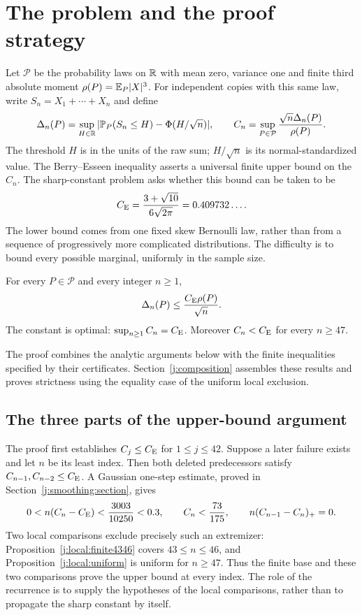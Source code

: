 \section{The problem and the proof strategy}
\label{j:introduction}

Let $\mathcal P$ be the probability laws on $\mathbb R$ with mean zero,
variance one and finite third absolute moment $\rho(P)=\mathbb E_P|X|^3$.
For independent copies with this same law, write $S_n=X_1+\cdots+X_n$
and define
\[
 \Delta_n(P)=\sup_{H\in\mathbb R}|\mathbb P_P(S_n\le H)-\Phi(H/\sqrt n)|,
 \qquad C_n=\sup_{P\in\mathcal P}\frac{\sqrt n\Delta_n(P)}{\rho(P)}.
\]
The threshold $H$ is in the units of the raw sum; $H/\sqrt n$ is its
normal-standardized value. The Berry--Esseen inequality
\cite{Berry1941,Esseen1942,Esseen1945} asserts a universal finite upper
bound on the $C_n$. The sharp-constant problem asks whether this bound
can be taken to be
\[
 C_{\mathrm E}=\frac{3+\sqrt{10}}{6\sqrt{2\pi}}=0.409732\ldots.
\]
The lower bound comes from one fixed skew Bernoulli law, rather than
from a sequence of progressively more complicated distributions.
The difficulty is to bound every possible marginal, uniformly in the
sample size.

\begin{theorem}\label{j:main}
For every $P\in\mathcal P$ and every integer $n\ge1$,
\[
 \Delta_n(P)\le\frac{C_{\mathrm E}\rho(P)}{\sqrt n}.
\]
The constant is optimal: $\sup_{n\ge1}C_n=C_{\mathrm E}$.
Moreover $C_n<C_{\mathrm E}$ for every $n\ge47$.
\end{theorem}
The proof combines the analytic arguments below with the finite
inequalities specified by their certificates. Section~\ref{j:composition}
assembles these results and proves strictness using the equality case
of the uniform local exclusion.

\subsection{The three parts of the upper-bound argument}

The proof first establishes $C_j\le C_{\mathrm E}$ for $1\le j\le42$.
Suppose a later failure exists and let $n$ be its least index. Then both
deleted predecessors satisfy $C_{n-1},C_{n-2}\le C_{\mathrm E}$. A Gaussian
one-step estimate, proved in Section~\ref{j:smoothing:section}, gives
\[
 0<n(C_n-C_{\mathrm E})<\frac{3003}{10250}<0.3,\qquad
 C_n<\frac{73}{175},\qquad n(C_{n-1}-C_n)_+=0.
\]
Two local comparisons exclude precisely such an extremizer:
Proposition~\ref{j:local:finite4346} covers $43\le n\le46$,
and Proposition~\ref{j:local:uniform} is uniform for $n\ge47$.
Thus the finite base and these two comparisons prove the upper bound
at every index. The role of the recurrence is to supply the hypotheses
of the local comparisons, rather than to propagate the sharp constant
by itself.

